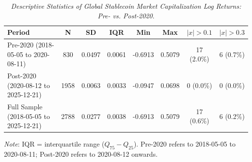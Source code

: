 \begin{table}[h]
  \centering
  \caption{\textit{Descriptive Statistics of Global Stablecoin Market Capitalization Log Returns: Pre- vs. Post-2020}.}
  \label{tab:stablecoindescstats20182025}
  \begin{tabular}{lccccccc}
    \toprule
    \textbf{Period} & \textbf{N} & \textbf{SD} & \textbf{IQR} & \textbf{Min} & \textbf{Max} & \textbf{$|x|>0.1$} & \textbf{$|x|>0.3$} \\ 
    \midrule
    Pre-2020 (2018-05-05 to 2020-08-11) & 830 & 0.0497 & 0.0061 & -0.6913 & 0.5079 & 17 (2.0\%) & 6 (0.7\%) \\ 
    Post-2020 (2020-08-12 to 2025-12-21) & 1958 & 0.0063 & 0.0033 & -0.0947 & 0.0698 & 0 (0.0\%) & 0 (0.0\%) \\ 
    Full Sample (2018-05-05 to 2025-12-21) & 2788 & 0.0277 & 0.0038 & -0.6913 & 0.5079 & 17 (0.6\%) & 6 (0.2\%) \\ 
    \bottomrule
  \end{tabular}
  \vspace{2pt}
  \footnotesize{\textit{Note}: IQR = interquartile range ($Q_{75}-Q_{25}$). Pre-2020 refers to 2018-05-05 to 2020-08-11; Post-2020 refers to 2020-08-12 onwards.}\\
\end{table}